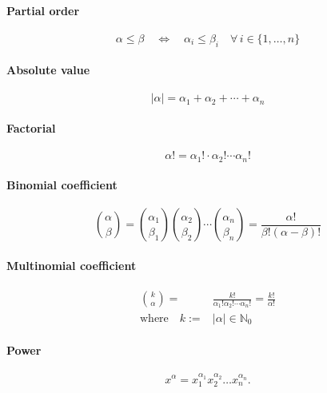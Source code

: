 \documentclass[11pt,a4paper]{article}
\begin{document}
\paragraph{Partial order}
\begin{equation}
\alpha \le \beta \quad \Leftrightarrow \quad \alpha_i \le \beta_i \quad \forall\,i\in\{1,\ldots,n\}
\end{equation}
\paragraph{Absolute value}
\begin{equation}
| \alpha | = \alpha_1 + \alpha_2 + \cdots + \alpha_n
\end{equation}
\paragraph{Factorial}
\begin{equation}
\alpha ! = \alpha_1! \cdot \alpha_2! \cdots \alpha_n!
\end{equation}
\paragraph{Binomial coefficient} 
\begin{equation}
\binom{\alpha}{\beta} = \binom{\alpha_1}{\beta_1}\binom{\alpha_2}{\beta_2}\cdots\binom{\alpha_n}{\beta_n} = \frac{\alpha!}{\beta!(\alpha-\beta)!}
\end{equation}
\paragraph{Multinomial coefficient}
\begin{align}
\binom {k}{\alpha} =& \frac{k!}{\alpha _{1}!\alpha _{2}!\cdots \alpha _{n}!} = \frac {k!}{\alpha !}\\
\text{where} \quad k :=& |\alpha |\in \mathbb {N} _{0}
\end{align}
\paragraph{Power}
\begin{equation}
x^\alpha = x_1^{\alpha_1} x_2^{\alpha_2} \ldots x_n^{\alpha_n}.
\end{equation}
\end{document}
